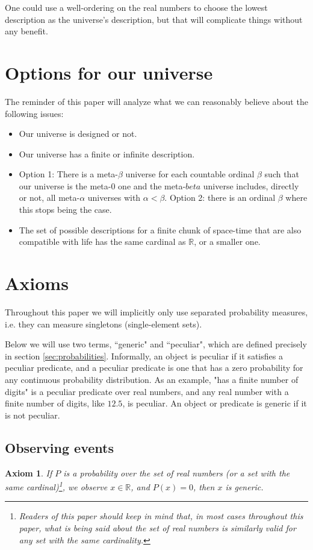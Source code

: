 \documentclass[a4paper
,draft
]{article}
\def\reale{\mathbb{R}}
\newcommand{\ghilimele}[1]{``#1"}
\newtheorem{axiom}{Axiom}
\begin{document}
One could use a well-ordering on the real numbers to choose the
lowest description as the universe's description, but that will
complicate things without any benefit.

\section{Options for our universe}
\label{sec:options}

The reminder of this paper will analyze what we can reasonably believe about
the following issues:
\begin{itemize}
  \item Our universe is designed or not.
  \item Our universe has a finite or infinite description.
  \item Option 1: There is a meta-$\beta$ universe for each countable ordinal
        $\beta$ such that our universe is the meta-$0$ one and the meta-$beta$
        universe includes, directly or not, all meta-$\alpha$ universes with
        $\alpha < \beta$. Option 2: there is an ordinal $\beta$ where this
        stops being the case.
  \item The set of possible descriptions for a finite chunk of space-time
        that are also compatible with life has the same cardinal as $\reale$,
        or a smaller one.
\end{itemize}

\section{Axioms}
\label{sec:axioms}

Throughout this paper we will implicitly only use separated probability
measures, i.e. they can measure singletons (single-element sets).

Below we will use two terms, \ghilimele{generic} and \ghilimele{peculiar},
which are defined precisely in section \ref{sec:probabilities}. Informally,
an object is peculiar if it satisfies a peculiar predicate, and a peculiar
predicate is one that has a zero probability for any continuous probability
distribution. As an example, "has a finite number of digits" is a peculiar
predicate over real numbers, and any real number with a finite number
of digits, like $12.5$, is peculiar. An object or predicate is generic if
it is not peculiar.

\subsection{Observing events}
\begin{axiom}
  \label{ax:zeroisgeneric}
  If $P$ is a probability over the set of real numbers
  (or a set with the same cardinal)\footnote{Readers of this paper should
  keep in mind that, in most cases throughout this paper, what is being said
  about the set of real numbers is similarly valid for any set with the same
  cardinality.},
  we observe $x\in\reale$, and $P(x)=0$, then $x$ is generic.
\end{axiom}
\end{document}
